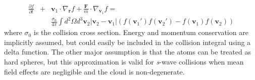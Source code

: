 \documentclass[%
 reprint,
 amsmath,amssymb,
 aps,
]{revtex4-1}
\begin{document}
\begin{eqnarray}
\frac{\partial f}{\partial t}&+&\mathbf{v}_1\cdot\nabla_\mathbf{r}f+\frac{\mathbf{F}}{m}\cdot\nabla_{\mathbf{v}_1}f = \label{eq:boltzmann}\\
& &\frac{\sigma_0}{4\pi} \int d^2\Omega d^3\mathbf{v}_2\left|\mathbf{v}_2-\mathbf{v}_1\right|\left(f(\mathbf{v}_1')f(\mathbf{v}_2')-f(\mathbf{v}_1)f(\mathbf{v}_2)\right)\nonumber
\end{eqnarray}
where $\sigma_0$ is the collision cross section. Energy and momentum conservation are implicitly assumed, but could easily be included in the collision integral using a delta function. The other major assumption is that the atoms can be treated as hard spheres, but this approximation is valid for \textit{s}-wave collisions when mean field effects are negligible and the cloud is non-degenerate. %
\end{document}
